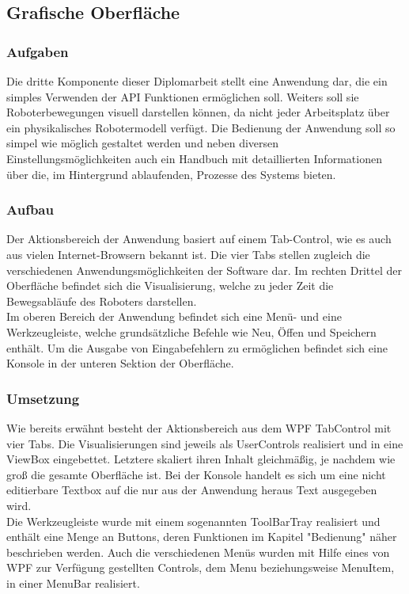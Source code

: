 
\subsection{Grafische Oberfläche}

\subsubsection{Aufgaben}
Die dritte Komponente dieser Diplomarbeit stellt eine Anwendung dar, die ein simples Verwenden der API Funktionen ermöglichen soll. Weiters soll sie Roboterbewegungen visuell darstellen können, da nicht jeder Arbeitsplatz über ein physikalisches Robotermodell verfügt. Die Bedienung der Anwendung soll so simpel wie möglich gestaltet werden und neben diversen Einstellungsmöglichkeiten auch ein Handbuch mit detaillierten Informationen über die, im Hintergrund ablaufenden, Prozesse des Systems bieten.
\subsubsection{Aufbau}
Der Aktionsbereich der Anwendung basiert auf einem Tab-Control, wie es auch aus vielen Internet-Browsern bekannt ist. Die vier Tabs stellen zugleich die verschiedenen Anwendungsmöglichkeiten der Software dar. Im rechten Drittel der Oberfläche befindet sich die Visualisierung, welche zu jeder Zeit die Bewegsabläufe des Roboters darstellen. \\
Im oberen Bereich der Anwendung befindet sich eine Menü- und eine Werkzeugleiste, welche grundsätzliche Befehle wie Neu, Öffen und Speichern enthält. Um die Ausgabe von Eingabefehlern zu ermöglichen befindet sich eine Konsole in der unteren Sektion der Oberfläche.
\subsubsection{Umsetzung}
Wie bereits erwähnt besteht der Aktionsbereich aus dem WPF TabControl mit vier Tabs. Die Visualisierungen sind jeweils als UserControls realisiert und in eine ViewBox eingebettet. Letztere skaliert ihren Inhalt gleichmäßig, je nachdem wie groß die gesamte Oberfläche ist. Bei der Konsole handelt es sich um eine nicht editierbare Textbox auf die nur aus der Anwendung heraus Text ausgegeben wird. \\
Die Werkzeugleiste wurde mit einem sogenannten ToolBarTray realisiert und enthält eine Menge an Buttons, deren Funktionen im Kapitel "Bedienung" näher beschrieben werden. Auch die verschiedenen Menüs wurden mit Hilfe eines von WPF zur Verfügung gestellten Controls, dem Menu beziehungsweise MenuItem, in einer MenuBar realisiert.
